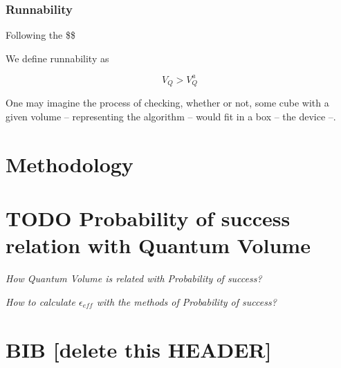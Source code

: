 \documentclass[11pt]{article}
\begin{document}
\subsubsection{Runnability}
\label{sec:orgb502561}

Following the \$\$

We define runnability as 

$$V_Q > V_Q^a$$

One may imagine the process of checking, whether or not, some cube with a given volume -- representing the algorithm -- would fit in a box -- the device --.

\section{Methodology}
\label{sec:org61e2f75}

\section{{\bfseries\sffamily TODO} Probability of success relation with Quantum Volume}
\label{sec:org1894d2c}

\emph{How Quantum Volume is related with Probability of success?}

\emph{How to calculate \(\epsilon_{eff}\) with the methods of Probability of success?}



\section{BIB [delete this HEADER]}
\label{sec:org4a0c6d4}



\end{document}

